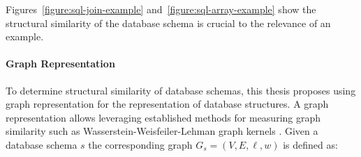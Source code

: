 Figures~\ref{figure:sql-join-example} and~\ref{figure:sql-array-example} show
the structural similarity of the database schema is crucial to
the relevance of an example.

\paragraph{Graph Representation}\label{design:graph-repr}

To determine structural similarity of database schemas, this thesis proposes
using graph representation for the representation of database structures. A
graph representation allows leveraging established methods for measuring graph
similarity such as Wasserstein-Weisfeiler-Lehman graph kernels \citep{WWL}. 
Given a database schema $s$ the corresponding graph $G_s = (V, E, \ell, w)$ is
defined as:

